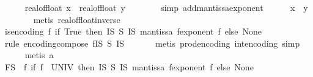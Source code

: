 \begin{isabellebody}
\ \ \ \ \isamarkupfalse%
\ {\isachardoublequoteopen}real{\isacharunderscore}{\kern0pt}of{\isacharunderscore}{\kern0pt}float\ x\ {\isacharequal}{\kern0pt}\ real{\isacharunderscore}{\kern0pt}of{\isacharunderscore}{\kern0pt}float\ y{\isachardoublequoteclose}\isanewline
\ \ \ \ \ \ \isamarkupfalse%
\ {\isacharparenleft}{\kern0pt}simp\ add{\isacharcolon}{\kern0pt}mantissa{\isacharunderscore}{\kern0pt}exponent{\isacharparenright}{\kern0pt}\isanewline
\ \ \ \ \isamarkupfalse%
\ {\isachardoublequoteopen}x\ {\isacharequal}{\kern0pt}\ y{\isachardoublequoteclose}\isanewline
\ \ \ \ \ \ \isamarkupfalse%
\ {\isacharparenleft}{\kern0pt}metis\ real{\isacharunderscore}{\kern0pt}of{\isacharunderscore}{\kern0pt}float{\isacharunderscore}{\kern0pt}inverse{\isacharparenright}{\kern0pt}\isanewline
\ \ \isamarkupfalse%
\isanewline
\ \ \isamarkupfalse%
\ {\isachardoublequoteopen}is{\isacharunderscore}{\kern0pt}encoding\ {\isacharparenleft}{\kern0pt}{\isasymlambda}f{\isachardot}{\kern0pt}\ if\ True\ then\ {\isacharparenleft}{\kern0pt}{\isacharparenleft}{\kern0pt}I\isactrlsub S\ {\isasymtimes}\isactrlsub S\ I\isactrlsub S{\isacharparenright}{\kern0pt}\ {\isacharparenleft}{\kern0pt}mantissa\ f{\isacharcomma}{\kern0pt}exponent\ f{\isacharparenright}{\kern0pt}{\isacharparenright}{\kern0pt}\ else\ None{\isacharparenright}{\kern0pt}{\isachardoublequoteclose}\isanewline
\ \ \ \ \isamarkupfalse%
\ {\isacharparenleft}{\kern0pt}rule\ encoding{\isacharunderscore}{\kern0pt}compose{\isacharbrackleft}{\kern0pt}\ f{\isacharequal}{\kern0pt}{\isachardoublequoteopen}{\isacharparenleft}{\kern0pt}I\isactrlsub S\ {\isasymtimes}\isactrlsub S\ I\isactrlsub S{\isacharparenright}{\kern0pt}{\isachardoublequoteclose}{\isacharbrackright}{\kern0pt}{\isacharparenright}{\kern0pt}\isanewline
\ \ \ \ \ \isamarkupfalse%
\ {\isacharparenleft}{\kern0pt}metis\ prod{\isacharunderscore}{\kern0pt}encoding\ int{\isacharunderscore}{\kern0pt}encoding{\isacharcomma}{\kern0pt}\ simp{\isacharparenright}{\kern0pt}\isanewline
\ \ \ \ \isamarkupfalse%
\ {\isacharparenleft}{\kern0pt}metis\ a{\isacharparenright}{\kern0pt}\isanewline
\ \ \isamarkupfalse%
\ \isamarkupfalse%
\ {\isachardoublequoteopen}F\isactrlsub S\ {\isacharequal}{\kern0pt}\ {\isacharparenleft}{\kern0pt}{\isasymlambda}f{\isachardot}{\kern0pt}\ if\ f\ {\isasymin}\ UNIV\ then\ {\isacharparenleft}{\kern0pt}{\isacharparenleft}{\kern0pt}I\isactrlsub S\ {\isasymtimes}\isactrlsub S\ I\isactrlsub S{\isacharparenright}{\kern0pt}\ {\isacharparenleft}{\kern0pt}mantissa\ f{\isacharcomma}{\kern0pt}exponent\ f{\isacharparenright}{\kern0pt}{\isacharparenright}{\kern0pt}\ else\ None{\isacharparenright}{\kern0pt}{\isachardoublequoteclose}\isanewline

\end{isabellebody}
